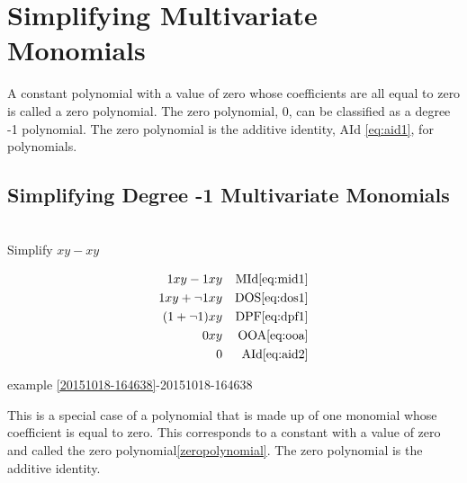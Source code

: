 \documentclass[20150903-160354-rs2.2-MarksMathNotebook.tex]{subfiles}
\begin{document}
%
%

\chapter{Simplifying Multivariate Monomials}


\begin{definition}\label{zeropolynomial}
A constant polynomial with a value of zero whose coefficients are all equal to zero is called a zero polynomial.  The zero polynomial, 0, can be classified as a degree -1 polynomial.  The zero polynomial is the additive identity, AId \eqref{eq:aid1}, for polynomials.

\hfill \cite{mathworld:zeropolynomial}
\end{definition}


\section{Simplifying Degree -1 Multivariate Monomials}\label{Simplify!Degree -1 Multivariate Monomials}

\begin{example}[id:20151018-165132] \label{20151018-165132} \hfill \\
Simplify $xy-xy$

\soln

\solnsteps
\begin{align*}
1xy-1xy && \text{MId} \eqref{eq:mid1} \\
1xy + \neg 1 xy && \text{DOS} \eqref{eq:dos1} \\
(1+\neg 1)xy && \text{DPF} \eqref{eq:dpf1} \\
0xy && \text{OOA} \eqref{eq:ooa} \\
0 && \text{AId} \eqref{eq:aid2} 
\end{align*}

\qdepend

\qdependlist
example \ref{20151018-164638}-20151018-164638

\end{example}

\begin{remark}
	This is a special case of a polynomial that is made up of one monomial whose coefficient is equal to zero.  This corresponds to a constant with a value of zero and called the zero polynomial\ref{zeropolynomial}.  The zero polynomial is the additive identity.
\end{remark}
\end{document}
